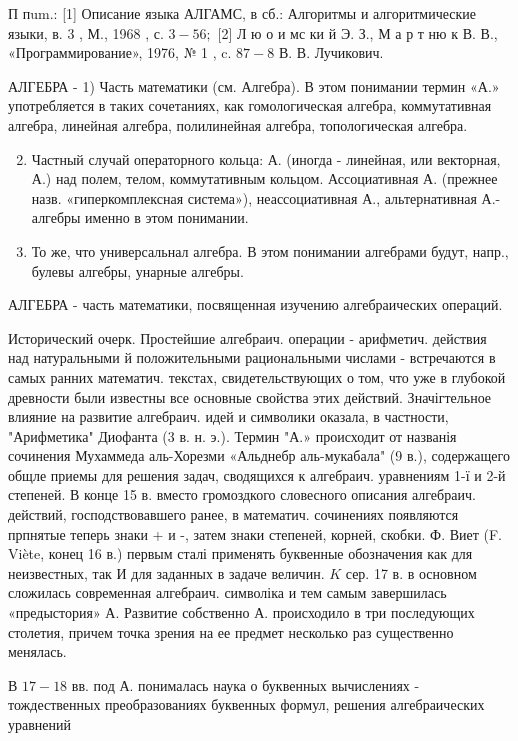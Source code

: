 \documentclass[10pt]{article}
\begin{document}
П пum.: [1] Описание языка АЛГАМС, в сб.: Алгоритмы и алгоритмические языки, в. 3 , М., 1968 , с. $3-56 ;$ [2] Л ю о и мс ки й Э. З., М а р т ню к В. В., «Программирование», 1976, № 1 , c. $87-8$ В. В. Лучикович.



АЛГЕБРА - 1) Часть математики (см. Алгебра). В этом понимании термин «А.» употребляется в таких сочетаниях, как гомологическая алгебра, коммутативная алгебра, линейная алгебра, полилинейная алгебра, топологическая алгебра.



\begin{enumerate}

  \setcounter{enumi}{1}

  \item Частный случай операторного кольца: А. (иногда - линейная, или векторная, А.) над полем, телом, коммутативным кольцом. Ассоциативная А. (прежнее назв. «гиперкомплексная система»), неассоциативная А., альтернативная А.- алгебры именно в этом понимании.



  \item То же, что универсальнал алгебра. В этом понимании алгебрами будут, напр., булевы алгебры, унарные алгебры.



\end{enumerate}



АЛГЕБРА - часть математики, посвященная изучению алгебраических операций.



Исторический очерк. Простейшие алгебраич. операции - арифметич. действия над натуральными й положительными рациональными числами - встречаются в самых ранних математич. текстах, свидетельствующих о том, что уже в глубокой древности были известны все основные свойства этих действий. Значігтельное влияние на развитие алгебраич. идей и символики оказала, в частности, "Арифметика" Диофанта (3 в. н. э.). Термин "А.» происходит от названія сочинения Мухаммеда аль-Хорезми «Альднебр аль-мукабала" (9 в.), содержащего общле приемы для решения задач, сводящихся к алгебраич. уравнениям 1-ї и 2-й степеней. В конце 15 в. вместо громоздкого словесного описания алгебраич. действий, господствовавшего ранее, в математич. сочинениях появляются прпнятые теперь знаки + и -, затем знаки степеней, корней, скобки. Ф. Виет (F. Viète, конец 16 в.) первым сталі применять буквенные обозначения как для неизвестных, так И для заданных в задаче величин. $K$ сер. 17 в. в основном сложилась современная алгебраич. символіка и тем самым завершилась «предыстория» А. Развитие собственно А. происходило в три последующих столетия, причем точка зрения на ее предмет несколько раз существенно менялась.



В $17-18$ вв. под А. понималась наука о буквенных вычислениях - тождественных преобразованиях буквенных формул, решения алгебраических уравнений
\end{document}
